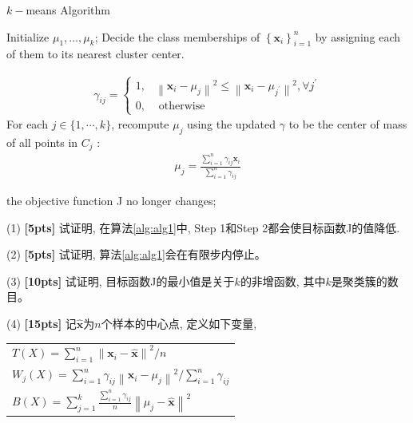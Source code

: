 \documentclass[a4paper,UTF8]{article}
\theoremstyle{definition}
\begin{document}
{\begin{algorithm}[h]
		\caption{ $k-$means Algorithm }
		\label{alg:alg1}
		\begin{algorithmic}[1]{
				\STATE Initialize $\mu_{1}, \ldots, \mu_{k}$;
				\REPEAT
				 Decide the class memberships of $\left\{\mathbf{x}_{i}\right\}_{i=1}^{n}$ by assigning each of them
				to its nearest cluster center.
				
				\begin{align}\gamma_{i j}=\left\{\begin{array}{ll}
				1, & \left\|\mathbf{x}_{i}-\mu_{j}\right\|^{2} \leq\left\|\mathbf{x}_{i}-\mu_{j^{\prime}}\right\|^{2}, \forall j^{\prime} \\
				0, & \text { otherwise }
				\end{array}\right.\end{align}
				 For each $j \in\{1, \cdots, k\}$, recompute $\mu_j$ using the updated 
$\gamma$ to be	the center of mass of all points in $C_j$ :
			\begin{align}\mu_{j}=\frac{\sum_{i=1}^{n} \gamma_{i j} \mathbf{x}_{i}}{\sum_{i=1}^{n} \gamma_{i j}}\end{align}	
		
				\UNTIL the objective function J no longer changes;}
		\end{algorithmic}
		
\end{algorithm}}


(1) \textbf{[5pts]} 试证明, 在算法\ref{alg:alg1}中, Step 1和Step 2都会使目标函数J的值降低.

(2) \textbf{[5pts]} 试证明, 算法\ref{alg:alg1}会在有限步内停止。


(3) \textbf{[10pts]} 试证明, 目标函数J的最小值是关于$k$的非增函数, 其中$k$是聚类簇的数目。

(4) \textbf{[15pts]} 记$\hat{\mathbf{x}}$为$n$个样本的中心点, 定义如下变量,

\begin{table}[h]
	\centering
	\begin{tabular}{l}
		$T(X)=\sum_{i=1}^{n}\left\|\mathbf{x}_{i}-\hat{\mathbf{x}}\right\|^{2} / n$  \\
		$W_{j}(X)=\sum_{i=1}^{n} \gamma_{i j}\left\|\mathbf{x}_{i}-\mu_{j}\right\|^{2} / \sum_{i=1}^{n} \gamma_{i j}$  \\
		$B(X)=\sum_{j=1}^{k} \frac{\sum_{i=1}^{n} \gamma_{i j}}{n}\left\|\mu_{j}-\hat{\mathbf{x}}\right\|^{2}$  \\
	\end{tabular}
\end{table}
\end{document}
